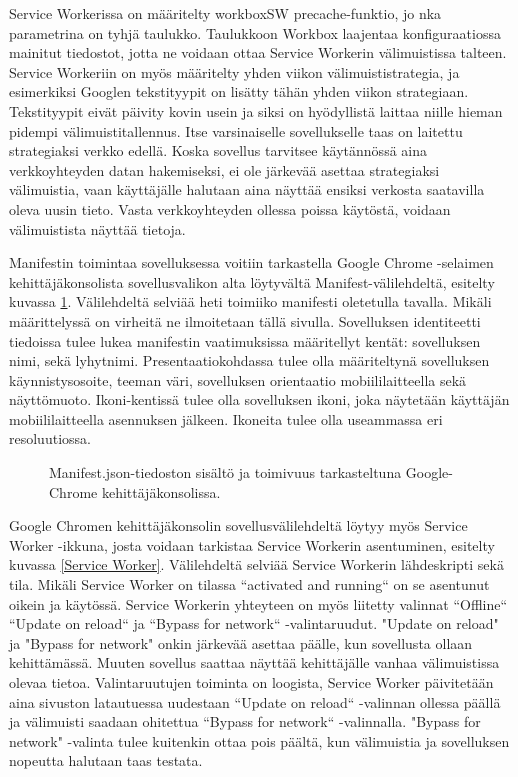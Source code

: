 \documentclass{tktltiki}
\begin{document}
Service Workerissa on määritelty workboxSW precache-funktio, jo nka parametrina on tyhjä taulukko. Taulukkoon Workbox laajentaa konfiguraatiossa mainitut tiedostot, jotta ne voidaan ottaa Service Workerin välimuistissa talteen. Service Workeriin on myös määritelty yhden viikon välimuististrategia, ja esimerkiksi Googlen tekstityypit on lisätty tähän yhden viikon strategiaan. Tekstityypit eivät päivity kovin usein ja siksi on hyödyllistä laittaa niille hieman pidempi välimuistitallennus. Itse varsinaiselle sovellukselle taas on laitettu strategiaksi verkko edellä. Koska sovellus tarvitsee käytännössä aina verkkoyhteyden datan hakemiseksi, ei ole järkevää asettaa strategiaksi välimuistia, vaan käyttäjälle halutaan aina näyttää ensiksi verkosta saatavilla oleva uusin tieto. Vasta verkkoyhteyden ollessa poissa käytöstä, voidaan välimuistista näyttää tietoja. 

Manifestin toimintaa sovelluksessa voitiin tarkastella Google Chrome -selaimen kehittäjäkonsolista sovellusvalikon alta löytyvältä Manifest-välilehdeltä, esitelty kuvassa \ref{Manifest.json}. Välilehdeltä selviää heti toimiiko manifesti oletetulla tavalla. Mikäli määrittelyssä on virheitä ne ilmoitetaan tällä sivulla. Sovelluksen identiteetti tiedoissa tulee lukea manifestin vaatimuksissa määritellyt kentät: sovelluksen nimi, sekä lyhytnimi. Presentaatiokohdassa tulee olla määriteltynä sovelluksen käynnistysosoite, teeman väri, sovelluksen orientaatio mobiililaitteella sekä näyttömuoto. Ikoni-kentissä tulee olla sovelluksen ikoni, joka näytetään käyttäjän mobiililaitteella asennuksen jälkeen. Ikoneita tulee olla useammassa eri resoluutiossa. 

\begin{figure}[h]
\begin{center}
\caption{Manifest.json-tiedoston sisältö ja toimivuus tarkasteltuna Google-Chrome kehittäjäkonsolissa.}
\label{Manifest.json}
\end{center}
\end{figure}
\clearpage

Google Chromen kehittäjäkonsolin sovellusvälilehdeltä löytyy myös Service Worker -ikkuna, josta voidaan tarkistaa Service Workerin asentuminen, esitelty kuvassa \ref{Service Worker}. Välilehdeltä selviää Service Workerin lähdeskripti sekä tila. Mikäli Service Worker on tilassa “activated and running“ on se asentunut oikein ja käytössä. Service Workerin yhteyteen on myös liitetty valinnat “Offline“ “Update on reload“ ja “Bypass for network“ -valintaruudut. "Update on reload" ja "Bypass for network" onkin järkevää asettaa päälle, kun sovellusta ollaan kehittämässä. Muuten sovellus saattaa näyttää kehittäjälle vanhaa välimuistissa olevaa tietoa. Valintaruutujen toiminta on loogista, Service Worker päivitetään aina sivuston latautuessa uudestaan “Update on reload“ -valinnan ollessa päällä ja välimuisti saadaan ohitettua “Bypass for network“ -valinnalla. "Bypass for network" -valinta tulee kuitenkin ottaa pois päältä, kun välimuistia ja sovelluksen nopeutta halutaan taas testata.
\end{document}
